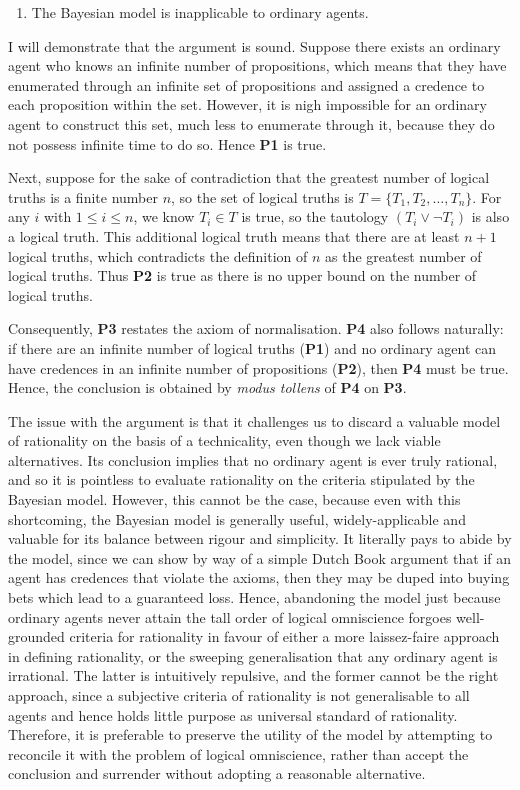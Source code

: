 \documentclass[12pt]{article}
\begin{document}
\begin{enumerate}[resume,label=\textbf{C:}, topsep=0pt, leftmargin=0.5in]
    \item The Bayesian model is inapplicable to ordinary agents.
\end{enumerate}

I will demonstrate that the argument is sound. Suppose there exists an ordinary agent who knows an infinite number of propositions, which means that they have enumerated through an infinite set of propositions and assigned a credence to each proposition within the set. However, it is nigh impossible for an ordinary agent to construct this set, much less to enumerate through it, because they do not possess infinite time to do so. Hence \textbf{P1} is true.

Next, suppose for the sake of contradiction that the greatest number of logical truths is a finite number $n$, so the set of logical truths is $T=\{T_1,T_2,\dots,T_n\}$. For any $i$ with $1\leq i\leq n$, we know $T_i\in T$ is true, so the tautology $(T_i\lor\lnot T_i)$ is also a logical truth. This additional logical truth means that there are at least $n+1$ logical truths, which contradicts the definition of $n$ as the greatest number of logical truths. Thus \textbf{P2} is true as there is no upper bound on the number of logical truths.

Consequently, \textbf{P3} restates the axiom of normalisation. \textbf{P4} also follows naturally: if there are an infinite number of logical truths (\textbf{P1}) and no ordinary agent can have credences in an infinite number of propositions (\textbf{P2}), then \textbf{P4} must be true. Hence, the conclusion is obtained by \textit{modus tollens} of \textbf{P4} on \textbf{P3}.

The issue with the argument is that it challenges us to discard a valuable model of rationality on the basis of a technicality, even though we lack viable alternatives. Its conclusion implies that no ordinary agent is ever truly rational, and so it is pointless to evaluate rationality on the criteria stipulated by the Bayesian model. However, this cannot be the case, because even with this shortcoming, the Bayesian model is generally useful, widely-applicable and valuable for its balance between rigour and simplicity. It literally pays to abide by the model, since we can show by way of a simple Dutch Book argument that if an agent has credences that violate the axioms, then they may be duped into buying bets which lead to a guaranteed loss.\autocite[44]{bdrc} Hence, abandoning the model just because ordinary agents never attain the tall order of logical omniscience forgoes well-grounded criteria for rationality in favour of either a more laissez-faire approach in defining rationality, or the sweeping generalisation that any ordinary agent is irrational. The latter is intuitively repulsive, and the former cannot be the right approach, since a subjective criteria of rationality is not generalisable to all agents and hence holds little purpose as universal standard of rationality. Therefore, it is preferable to preserve the utility of the model by attempting to reconcile it with the problem of logical omniscience, rather than accept the conclusion and surrender without adopting a reasonable alternative.
\end{document}
